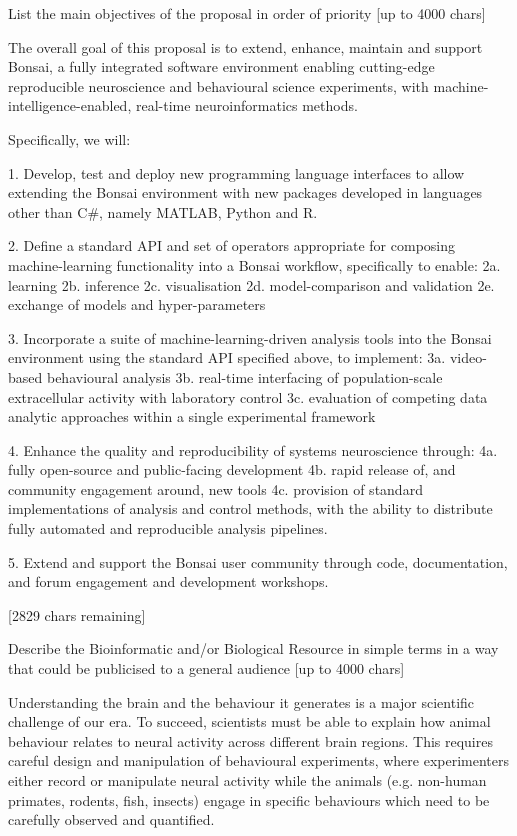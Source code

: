 
List the main objectives of the proposal in order of priority [up to
  4000 chars]

The overall goal of this proposal is to extend, enhance, maintain and support Bonsai, a fully integrated software environment enabling cutting-edge reproducible neuroscience and behavioural science experiments, with machine-intelligence-enabled, real-time neuroinformatics methods.

Specifically, we will:

1. Develop, test and deploy new programming language interfaces to allow extending the Bonsai environment with new packages developed in languages other than C#, namely MATLAB, Python and R.

2. Define a standard API and set of operators appropriate for composing machine-learning functionality into a Bonsai workflow, specifically to enable:
2a. learning
2b. inference
2c. visualisation
2d. model-comparison and validation
2e. exchange of models and hyper-parameters

3. Incorporate a suite of machine-learning-driven analysis tools into the Bonsai environment using the standard API specified above, to implement:
3a. video-based behavioural analysis
3b. real-time interfacing of population-scale extracellular activity with laboratory control  
3c. evaluation of competing data analytic approaches within a single experimental framework

4. Enhance the quality and reproducibility of systems neuroscience through:
4a. fully open-source and public-facing development
4b. rapid release of, and community engagement around, new tools
4c. provision of standard implementations of analysis and control methods, with the ability to distribute fully automated and reproducible analysis pipelines.

5. Extend and support the Bonsai user community through code, documentation, and forum engagement and development workshops.

[2829 chars remaining]




Describe the Bioinformatic and/or Biological Resource in simple terms in a way that could be publicised to a general audience [up to 4000 chars]

Understanding the brain and the behaviour it generates is a major scientific challenge of our era. To succeed, scientists must be able to explain how animal behaviour relates to neural activity across different brain regions. This requires careful design and manipulation of behavioural experiments, where experimenters either record or manipulate neural activity while the animals (e.g. non-human primates, rodents, fish, insects) engage in specific behaviours which need to be carefully observed and quantified. 

